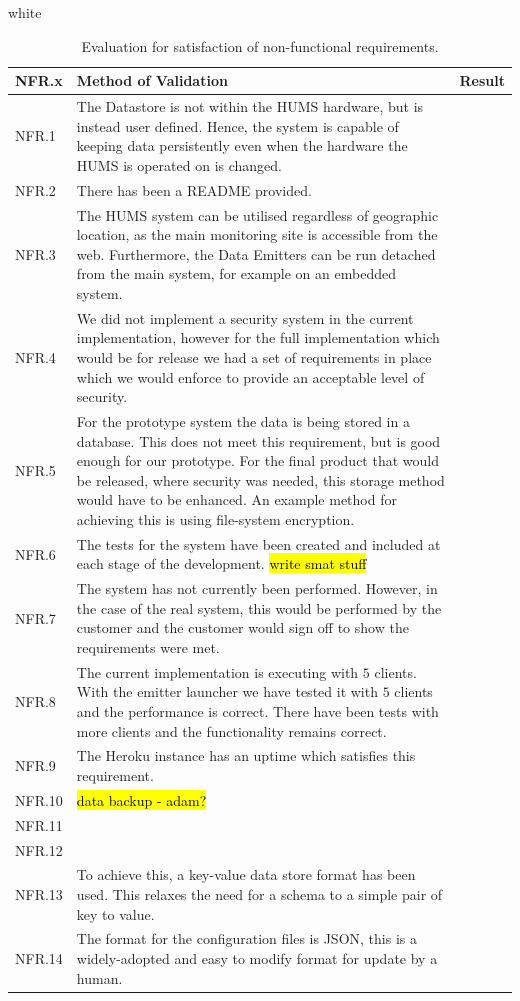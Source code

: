 \documentclass[10pt,a4paper]{article}
\newcommand{\xtableformat}[4]{
\begin{table}[ht!]
\centering
  \rowcolors{2}{gray!10} {white}
\begin{tabularx}{\textwidth}{#1}
  \hline
  \rowcolor[gray]{0.9} #2
  \hline
\end{tabularx}
\caption{#3}
\label{#4}
\end{table}}
\begin{document}
\xtableformat{ p{1.3cm} X X }{
	NFR.x  & 	Method of Validation & Result \\ \hline
	NFR.1  &The Datastore is not within the HUMS hardware, but is instead user defined. Hence, the system is capable of keeping data persistently even when the hardware the HUMS is operated on is changed. 	  & 	 \\ 
	NFR.2  &There has been a README provided. 	  & 	 \\ 
	NFR.3  & 	The HUMS system can be utilised regardless of geographic location, as the main monitoring site is accessible from the web. Furthermore, the Data Emitters can be run detached from the main system, for example on an embedded system. 	  & 	 \\ 
	NFR.4  &We did not implement a security system in the current implementation, however for the full implementation which would be for release we had a set of requirements in place which we would enforce to provide an acceptable level of security. 	  & 	\\ 
	NFR.5  & For the prototype system the data is being stored in a database. This does not meet this requirement, but is good enough for our prototype. For the final product that would be released, where security was needed, this storage method would have to be enhanced. An example method for achieving this is using file-system encryption. & \\
	NFR.6  &The tests for the system have been created and included at each stage of the development. \hl{write smat stuff} 	  & 	\\
	NFR.7  &The system has not currently been performed. However, in the case of the real system, this would be performed by the customer and the customer would sign off to show the requirements were met. 	  & 	 \\
	NFR.8  &The current implementation is executing with $5$ clients. With the emitter launcher we have tested it with $5$ clients and the performance is correct. There have been tests with more clients and the functionality remains correct.	  & 	 \\ 
	NFR.9  & The Heroku instance has an uptime which satisfies this requirement.	  & 	 \\ 
	NFR.10  & \hl{data backup - adam?}	  & 	 \\ 
	NFR.11  & 	  & 	 \\ 
	NFR.12  & 	  & 	 \\ 
	NFR.13  & 	To achieve this, a key-value data store format has been used. This relaxes the need for a schema to a simple pair of key to value.  & 	 \\
	NFR.14  & 	The format for the configuration files is JSON, this is a widely-adopted and easy to modify format for update by a human.  & 	 \\
}{Evaluation for satisfaction of non-functional requirements.}{nfrevaltable} %
\end{document}
